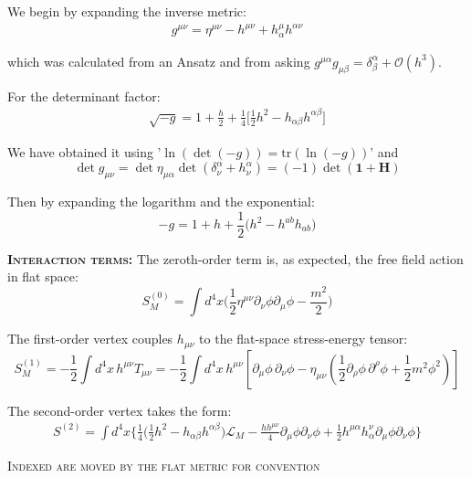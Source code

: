 \documentclass[12pt,a4paper]{article}
\begin{document}
\vspace{0.5cm}


We begin by expanding the inverse metric:
\begin{align}
\boxed{
g^{\mu\nu}
= \eta^{\mu\nu}-h^{\mu\nu}+h^\mu_\alpha h^{\alpha\nu}
}\label{eq:g^}
\end{align}

which was calculated from an Ansatz and from asking $g^{\mu\alpha}g_{\mu\beta}=\delta^\alpha_\beta + \mathcal{O}(h^3)$.

\vspace{0.5em}

For the determinant factor:
\begin{align}
\boxed{
\sqrt{-g}
= 1 + \frac h2 + \frac14\bigl[\frac12h^2-h_{\alpha\beta}h^{\alpha\beta}\bigr]}
\label{eq:sqrt-g}
\end{align}

We have obtained it using '$\ln(\det(-g))=\text{tr} (\ln(-g))$' and
\[
\det g_{\mu\nu}
= \det\eta_{\mu\alpha}\det(\delta^\alpha_\nu+h^\alpha_\nu)
= (-1)\det(\mathbf{1+H})
\]

Then by expanding the logarithm and the exponential:
\[
-g= 1+h+\frac12\bigl(h^2-h^{ab}h_{ab}\bigr)
\]


\vspace{1em}
\textsc{\textbf{Interaction terms:}}
The zeroth-order term is, as expected, the free field action in flat space:
\[
\boxed{
S_M^{(0)}
= \int d^4x \Big(\frac{1}{2}\eta^{\mu\nu}\partial_\nu \phi \partial_\mu \phi - \frac{m^2}{2}\Big)}
\]

The first-order vertex couples $h_{\mu\nu}$ to the flat-space stress-energy tensor:
\[
\boxed {
S_M^{(1)} = -\frac12 \int d^4x \, h^{\mu\nu}T_{\mu\nu}
=
-\frac12 \int d^4x \, h^{\mu\nu}
\left[
\partial_\mu \phi\, \partial_\nu \phi
- \eta_{\mu\nu}\left(\frac12 \partial_\rho \phi\, \partial^\rho \phi + \frac12 m^2 \phi^2\right)
\right]
}
\]

The second-order vertex takes the form:
\begin{align}
\boxed{
S^{(2)}=\int d^4x \Biggl\{
\frac{1}{4}\bigl(\frac12h^2-h_{\alpha\beta}h^{\alpha\beta}\bigr)\mathcal{L}_M \nonumber - \frac{hh^{\mu\nu}}{4}\partial_\mu\phi\partial_\nu\phi \nonumber + \frac{1}{2}h^{\mu\alpha}h_\alpha^\nu \partial_\mu\phi\partial_\nu\phi
\Biggr\}
}
\end{align}

\textsc{Indexed are moved by the flat metric for convention}
\vspace{1cm}
\end{document}

